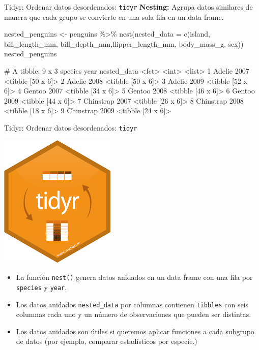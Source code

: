 \documentclass[
  ignorenonframetext,
  aspectratio=169]{beamer}
\newenvironment{Shaded}{\begin{snugshade}}{\end{snugshade}}
\newcommand{\AttributeTok}[1]{\textcolor[rgb]{0.77,0.63,0.00}{#1}}
\newcommand{\FunctionTok}[1]{\textcolor[rgb]{0.00,0.00,0.00}{#1}}
\newcommand{\NormalTok}[1]{#1}
\newcommand{\OtherTok}[1]{\textcolor[rgb]{0.56,0.35,0.01}{#1}}
\newcommand{\SpecialCharTok}[1]{\textcolor[rgb]{0.00,0.00,0.00}{#1}}
\let\oldverbatim\verbatim
\let\endoldverbatim\endverbatim
\renewenvironment{verbatim}{\tiny\oldverbatim}{\endoldverbatim}
\begin{document}
\begin{frame}[fragile]{Tidyr: Ordenar datos desordenados:
\texttt{tidyr}}
\protect\hypertarget{tidyr-ordenar-datos-desordenados-tidyr-2}{}
\textbf{Nesting:} Agrupa datos similares de manera que cada grupo se
convierte en una sola fila en un data frame.

\begin{Shaded}
\begin{Highlighting}[]
\NormalTok{nested\_penguins }\OtherTok{\textless{}{-}}\NormalTok{ penguins }\SpecialCharTok{\%\textgreater{}\%} 
    \FunctionTok{nest}\NormalTok{(}\AttributeTok{nested\_data =} 
           \FunctionTok{c}\NormalTok{(island, bill\_length\_mm, }
\NormalTok{             bill\_depth\_mm,flipper\_length\_mm,}
\NormalTok{             body\_mass\_g, sex))}
\NormalTok{nested\_penguins}
\end{Highlighting}
\end{Shaded}

\begin{verbatim}
# A tibble: 9 x 3
  species    year nested_data      
  <fct>     <int> <list>           
1 Adelie     2007 <tibble [50 x 6]>
2 Adelie     2008 <tibble [50 x 6]>
3 Adelie     2009 <tibble [52 x 6]>
4 Gentoo     2007 <tibble [34 x 6]>
5 Gentoo     2008 <tibble [46 x 6]>
6 Gentoo     2009 <tibble [44 x 6]>
7 Chinstrap  2007 <tibble [26 x 6]>
8 Chinstrap  2008 <tibble [18 x 6]>
9 Chinstrap  2009 <tibble [24 x 6]>
\end{verbatim}
\end{frame}

\begin{frame}[fragile]{Tidyr: Ordenar datos desordenados:
\texttt{tidyr}}
\protect\hypertarget{tidyr-ordenar-datos-desordenados-tidyr-3}{}
\begin{flushright}\includegraphics[width=0.05\linewidth]{Imgs/logo_tidyr} \end{flushright}

\begin{itemize}
\item
  La función \texttt{nest()} genera datos anidados en un data frame con
  una fila por \texttt{species} y \texttt{year}.
\item
  Los datos anidados \texttt{nested\_data} por columnas contienen
  \texttt{tibbles} con seis columnas cada uno y un número de
  observaciones que pueden ser distintas.
\item
  Los datos anidados son útiles si queremos aplicar funciones a cada
  subgrupo de datos (por ejemplo, comparar estadísticos por especie.)
\end{itemize}
\end{frame}
\end{document}
